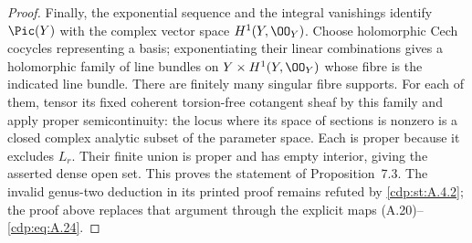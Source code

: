 \begin{proof}
Finally, the exponential sequence and the integral vanishings identify $\Pic(Y)$ with the complex vector space $H^1(Y,\OO_Y)$. Choose holomorphic Cech cocycles representing a basis; exponentiating their linear combinations gives a holomorphic family of line bundles on $Y\times H^1(Y,\OO_Y)$ whose fibre is the indicated line bundle. There are finitely many singular fibre supports. For each of them, tensor its fixed coherent torsion-free cotangent sheaf by this family and apply proper semicontinuity: the locus where its space of sections is nonzero is a closed complex analytic subset of the parameter space. Each is proper because it excludes $L_r$. Their finite union is proper and has empty interior, giving the asserted dense open set. This proves the statement of Proposition~7.3. The invalid genus-two deduction in its printed proof remains refuted by \ref{cdp:st:A.4.2}; the proof above replaces that argument through the explicit maps (A.20)--\eqref{cdp:eq:A.24}.
\end{proof}


